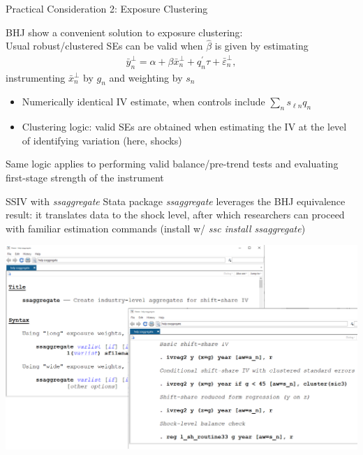 \documentclass{beamer}
\begin{document}
\begin{frame}{Practical Consideration 2: Exposure Clustering}


 BHJ show a convenient solution to exposure clustering:\\
Usual robust/clustered SEs can be valid when $\hat{\beta}$ is given by estimating
\begin{align*}
\bar{y}_n^\perp = \alpha+\beta\bar{x}_n^\perp+q_n^\prime\tau+\bar{\varepsilon}_n^\perp,
\end{align*}
instrumenting $\bar{x}_n^\perp$ by $g_n$ and weighting by $s_n$
\smallskip\pause{}
\begin{itemize}
\item Numerically identical IV estimate, when controls include $\sum_n s_{\ell n} q_n$\smallskip
\item Clustering logic: valid SEs are obtained when estimating the IV at the level of identifying variation (here, shocks)
\end{itemize}\pause{}
Same logic applies to performing valid balance/pre-trend tests and evaluating first-stage strength of the instrument\smallskip
\end{frame}

\begin{frame}{SSIV with \emph{ssaggregate}}
Stata package \emph{ssaggregate} leverages the BHJ equivalence result: it translates data to the shock level, after which researchers can proceed with familiar estimation commands (install w/ \emph{ssc install ssaggregate})

\begin{center}
\includegraphics[height=0.6\textheight]{lecture_includes/ssaggregate.png}
\end{center}

\end{frame}
\end{document}
